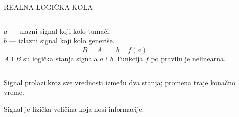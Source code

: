 \begin{frame}[label=08-s003]{REALNA LOGIČKA KOLA}
\begin{columns}[T,onlytextwidth]
$a$ — ulazni signal koji kolo tumači.\\[2mm]
$b$ — izlazni signal koji kolo generiše.
\[B=\overline A\qquad b=f(a)\]
$A$ i $B$ su logička stanja signala $a$ i $b$.
Funkcija $f$ po pravilu je nelinearna.
\medskip\par
{}
\centering

\end{columns}\medskip
Signal prolazi kroz sve vrednosti između dva stanja; promena traje konačno vreme.
\medskip\par\alert{Signal je fizička veličina koja nosi informacije.}
\end{frame}
